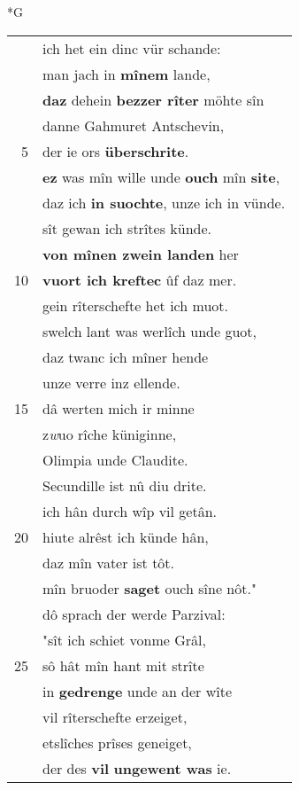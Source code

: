 \documentclass[8pt,a4paper,notitlepage]{article}
\begin{document}
\begin{table}[ht]
\begin{minipage}[t]{0.5\linewidth}
\small
\begin{center}*G
\end{center}
\begin{tabular}{rl}
 & ich het ein dinc vür schande:\\ 
 & man jach in \textbf{mînem} lande,\\ 
 & \textbf{daz} dehein \textbf{bezzer rîter} möhte sîn\\ 
 & danne Gahmuret Antschevin,\\ 
5 & der ie ors \textbf{überschrite}.\\ 
 & \textbf{ez} was mîn wille unde \textbf{ouch} mîn \textbf{site},\\ 
 & daz ich \textbf{in suochte}, unze ich in vünde.\\ 
 & sît gewan ich strîtes künde.\\ 
 & \textbf{von mînen zwein landen} her\\ 
10 & \textbf{vuort ich kreftec} ûf daz mer.\\ 
 & gein rîterschefte het ich muot.\\ 
 & swelch lant was werlîch unde guot,\\ 
 & daz twanc ich mîner hende\\ 
 & unze verre inz ellende.\\ 
15 & dâ werten mich ir minne\\ 
 & z\textit{w}uo rîche küniginne,\\ 
 & Olimpia unde Claudite.\\ 
 & Secundille ist nû diu drite.\\ 
 & ich hân durch wîp vil getân.\\ 
20 & hiute alrêst ich künde hân,\\ 
 & daz mîn vater ist tôt.\\ 
 & mîn bruoder \textbf{saget} ouch sîne nôt."\\ 
 & dô sprach der werde Parzival:\\ 
 & "sît ich schiet vonme Grâl,\\ 
25 & sô hât mîn hant mit strîte\\ 
 & in \textbf{gedrenge} unde an der wîte\\ 
 & vil rîterschefte erzeiget,\\ 
 & etslîches prîses geneiget,\\ 
 & der des \textbf{vil} \textbf{ungewent was} ie.\\ 

\end{tabular}
\end{minipage}
\end{table}
\end{document}

